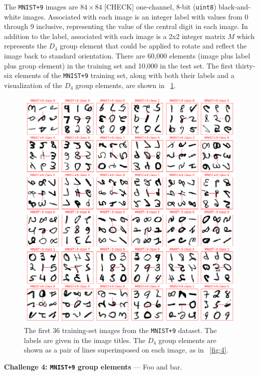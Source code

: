 \documentclass{article}
\renewcommand{\paragraph}[1]{\par\medskip\noindent\textbf{#1} ---}
\newcommand{\figref}[1]{\figurename~\ref{#1}}
\begin{document}
The \texttt{MNIST+9} images are $84\times 84$ [CHECK] one-channel, 8-bit (\texttt{uint8}) black-and-white images.
Associated with each image is an integer label with values from 0 through 9 inclusive, representing the value of the central digit in each image.
In addition to the label, associated with each image is a 2x2 integer matrix $M$ which represents the $D_4$ group element that could be applied to rotate and reflect the image back to standard orientation.
There are 60,000 elements (image plus label plus group element) in the training set and 10,000 in the test set.
The first thirty-six elements of the \texttt{MNIST+9} training set, along with both their labels and a visualization of the $D_4$ group elements, are shown in \figref{fig:9}.
\begin{figure}[t!]
\includegraphics[width=\textwidth]{../notebooks/MNIST+9.png}
\caption{The first 36 training-set images from the \texttt{MNIST+9} dataset. The labels are given in the image titles. The $D_4$ group elements are shown as a pair of lines superimposed on each image, as in \figref{fig:4}.\label{fig:9}}
\end{figure}

\paragraph{Challenge 4: \texttt{MNIST+9} group elements}
Foo and bar.
\end{document}
